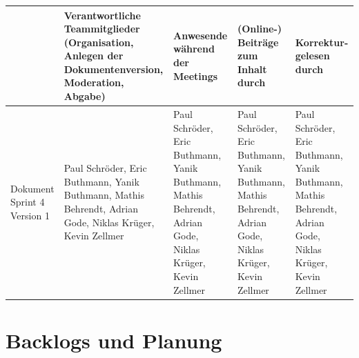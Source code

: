 \documentclass[a4paper,11pt]{article}
\begin{document}
\begin{table}[h]
	\centering
	\footnotesize
	\begin{tabular}{| p{1.5cm} | p{2.5cm} | p{2cm} | p{2cm} | p{2cm} |}
		\hline
		                            & Verantwortliche Teammitglieder (Organisation, Anlegen der Dokumentenversion, Moderation, Abgabe)         & Anwesende während der Meetings                                                                           & (Online-) Beiträge zum Inhalt durch                                                                      & Korrektur-gelesen durch                                                                                  \\
		\hline
		Dokument Sprint 4 Version 1 & Paul Schröder, Eric Buthmann, Yanik Buthmann, Mathis Behrendt, Adrian Gode, Niklas Krüger, Kevin Zellmer & Paul Schröder, Eric Buthmann, Yanik Buthmann, Mathis Behrendt, Adrian Gode, Niklas Krüger, Kevin Zellmer & Paul Schröder, Eric Buthmann, Yanik Buthmann, Mathis Behrendt, Adrian Gode, Niklas Krüger, Kevin Zellmer & Paul Schröder, Eric Buthmann, Yanik Buthmann, Mathis Behrendt, Adrian Gode, Niklas Krüger, Kevin Zellmer \\
		\hline
	\end{tabular}
\end{table}

\section{Backlogs und Planung}
\end{document}
